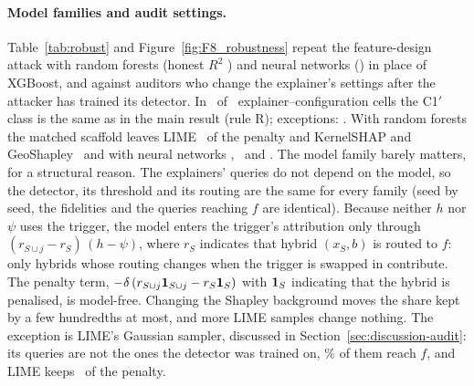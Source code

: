 \paragraph{Model families and audit settings.} Table~\ref{tab:robust} and Figure~\ref{fig:F8_robustness} repeat the
feature-design attack with random forests (honest $R^2$ \HonestRtwoForest) and neural networks (\HonestRtwoNet) in
place of XGBoost, and against auditors who change the explainer's settings after the attacker has trained its
detector. In \RobHold\ of \RobCells\ explainer--configuration cells the C1$'$ class is the same as in the main result
(rule R); exceptions: \RobBreakList.
With random forests the matched scaffold leaves LIME \RobRandomforestLIMEKept\ of the penalty and KernelSHAP and
GeoShapley \RobRandomforestKernelSHAPKept\ and \RobRandomforestGeoShapleyKept\;
with neural networks \RobNeuralnetLIMEKept, \RobNeuralnetKernelSHAPKept\ and \RobNeuralnetGeoShapleyKept. The model
family barely matters, for a structural reason. The explainers' queries do not depend on the model, so the detector,
its threshold and its routing are the same for every family (seed by seed, the fidelities and the queries reaching $f$
are identical). Because neither $h$ nor $\psi$ uses the trigger, the model enters the trigger's attribution only
through $(r_{S\cup j} - r_S)\,(h - \psi)$, where $r_S$ indicates that hybrid $(x_S, b)$ is routed to $f$: only hybrids
whose routing changes when the trigger is swapped in contribute. The penalty term,
$-\delta\,(r_{S\cup j}\mathbf{1}_{S\cup j} - r_S\mathbf{1}_S)$ with $\mathbf{1}_S$ indicating that the hybrid is penalised, is model-free. Changing the Shapley background
moves the share kept by a few hundredths at most, and more LIME samples change nothing. The exception is LIME's
Gaussian sampler, discussed in Section~\ref{sec:discussion-audit}: its queries are not the ones the detector was
trained on, \RobLIMEGaussiansampleLIMELeak\% of them reach $f$, and LIME keeps \RobLIMEGaussiansampleLIMEKept\ of
the penalty.



